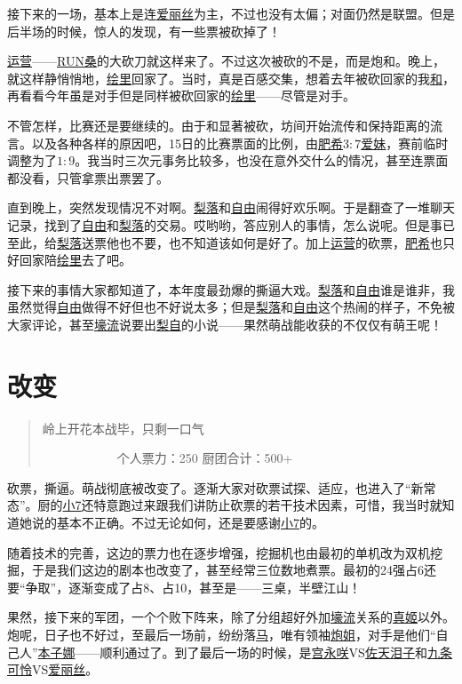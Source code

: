 接下来的一场，基本上是连\uline{爱丽丝}为主，不过也没有太偏；对面仍然是联盟。但是后半场的时候，惊人的发现，有一些票被砍掉了！

\uline{运营}——\uline{RUN桑}的大砍刀就这样来了。不过这次被砍的不是，而是炮和。晚上，就这样静悄悄地，\uline{绘里}回家了。当时，真是百感交集，想着去年被砍回家的我\uline{和}，再看看今年虽是对手但是同样被砍回家的\uline{绘里}——尽管是对手。

不管怎样，比赛还是要继续的。由于和显著被砍，坊间开始流传和保持距离的流言。以及各种各样的原因吧，15日的比赛票面的比例，由\uline{肥希}$3:7$\uline{爱妹}，赛前临时调整为了$1:9$。我当时三次元事务比较多，也没在意外交什么的情况，甚至连票面都没看，只管拿票出票罢了。

直到晚上，突然发现情况不对啊。\uline{梨落}和\uline{自由}闹得好欢乐啊。于是翻查了一堆聊天记录，找到了\uline{自由}和\uline{梨落}的交易。哎哟哟，答应别人的事情，怎么说呢。但是事已至此，给\uline{梨落}送票他也不要，也不知道该如何是好了。加上\uline{运营}的砍票，\uline{肥希}也只好回家陪\uline{绘里}去了吧。

接下来的事情大家都知道了，本年度最劲爆的撕逼大戏。\uline{梨落}和\uline{自由}谁是谁非，我虽然觉得\uline{自由}做得不好但也不好说太多；但是\uline{梨落}和\uline{自由}这个热闹的样子，不免被大家评论，甚至\uline{壕流}说要出\uline{梨}\uline{自}的小说——果然萌战能收获的不仅仅有萌王呢！

\chapter{改变}
\begin{quote}
岭上开花本战毕，只剩一口气

　　　　　　个人票力：250 厨团合计：500+
\end{quote}

砍票，撕逼。萌战彻底被改变了。逐渐大家对砍票试探、适应，也进入了“新常态”。厨的\uline{小7}还特意跑过来跟我们讲防止砍票的若干技术因素，可惜，我当时就知道她说的基本不正确。不过无论如何，还是要感谢\uline{小7}的。

随着技术的完善，这边的票力也在逐步增强，挖掘机也由最初的单机改为双机挖掘，于是我们这边的剧本也改变了，甚至经常三位数地煮票。最初的24强占6还要“争取”，逐渐变成了占8、占10，甚至是——三桌，半壁江山！

果然，接下来的军团，一个个败下阵来，除了分组超好外加\uline{壕流}关系的\uline{真姬}以外。炮呢，日子也不好过，至最后一场前，纷纷落\uline{马}，唯有领袖\uline{炮姐}，对手是他们“自己人”\uline{本子娜}——顺利通过了。到了最后一场的时候，是\uline{宫永咲}VS\uline{佐天泪子}和\uline{九条可怜}VS\uline{爱丽丝}。

